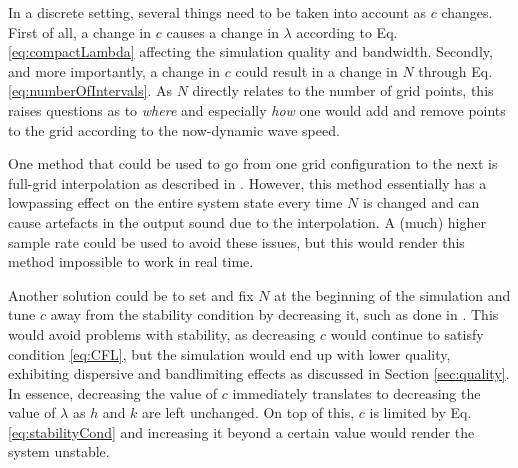 
%
%
In a discrete setting, several things need to be taken into account as $c$ changes. First of all, a change in $c$ causes a change in $\lambda$ according to Eq. \eqref{eq:compactLambda} affecting the simulation quality and bandwidth. Secondly, and more importantly, a change in $c$ could result in a change in $N$ through Eq. \eqref{eq:numberOfIntervals}. As $N$ directly relates to the number of grid points, this raises questions as to \textit{where} and especially \textit{how} one would add and remove points to the grid according to the now-dynamic wave speed.

One method that could be used to go from one grid configuration to the next is full-grid interpolation as described in \cite[Chap. 5]{bilbao2009}. However, this method essentially has a lowpassing effect on the entire system state every time $N$ is changed and can cause artefacts in the output sound due to the interpolation. A (much) higher sample rate could be used to avoid these issues, but this would render this method impossible to work in real time.

Another solution could be to set and fix $N$ at the beginning of the simulation and tune $c$ away from the stability condition by decreasing it, such as done in \cite{Willemsen2019}. This would avoid problems with stability, as decreasing $c$ would continue to satisfy condition \eqref{eq:CFL}, but the simulation would end up with lower quality, exhibiting dispersive and bandlimiting effects as discussed in Section \ref{sec:quality}. In essence, decreasing the value of $c$ immediately translates to decreasing the value of $\lambda$ as $h$ and $k$ are left unchanged. On top of this, $c$ is limited by Eq. \eqref{eq:stabilityCond} and increasing it beyond a certain value would render the system unstable.


